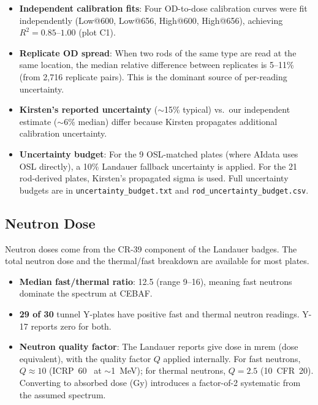 \documentclass[11pt,letterpaper]{article}
\newcommand{\CEBAF}{CEBAF}
\begin{document}
\begin{itemize}
    \item \textbf{Independent calibration fits}: Four OD-to-dose calibration
    curves were fit independently (Low@600, Low@656, High@600, High@656),
    achieving $R^2 = 0.85$--$1.00$ (plot C1).

    \item \textbf{Replicate OD spread}: When two rods of the same type are
    read at the same location, the median relative difference between replicates
    is 5--11\% (from 2,716 replicate pairs). This is the dominant source of
    per-reading uncertainty.

    \item \textbf{Kirsten's reported uncertainty} ($\sim$15\% typical) vs.\
    our independent estimate ($\sim$6\% median) differ because Kirsten
    propagates additional calibration uncertainty.

    \item \textbf{Uncertainty budget}: For the 9 OSL-matched plates (where
    AIdata uses OSL directly), a 10\% Landauer fallback uncertainty is applied.
    For the 21 rod-derived plates, Kirsten's propagated sigma is used. Full
    uncertainty budgets are in \texttt{uncertainty\_budget.txt} and
    \texttt{rod\_uncertainty\_budget.csv}.
\end{itemize}

\subsection{Neutron Dose}

Neutron doses come from the CR-39 component of the Landauer badges. The total
neutron dose and the thermal/fast breakdown are available for most plates.

\begin{itemize}
    \item \textbf{Median fast/thermal ratio}: 12.5 (range 9--16), meaning fast
    neutrons dominate the spectrum at \CEBAF.
    \item \textbf{29 of 30} tunnel Y-plates have positive fast and thermal
    neutron readings. Y-17 reports zero for both.
    \item \textbf{Neutron quality factor}: The Landauer reports give dose in
    mrem (dose equivalent), with the quality factor $Q$ applied internally.
    For fast neutrons, $Q \approx 10$ (ICRP~60~\cite{ICRP60} at $\sim$\SI{1}{MeV}); for
    thermal neutrons, $Q = 2.5$ (10~CFR~20). Converting to absorbed dose (Gy)
    introduces a factor-of-2 systematic from the assumed spectrum.
\end{itemize}
\end{document}
